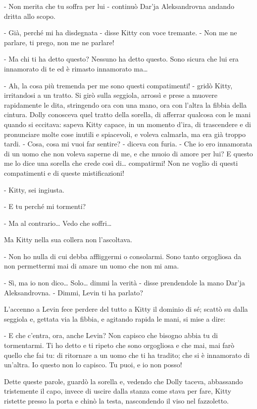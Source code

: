 - Non merita che tu soffra per lui - continuò Dar'ja Aleksandrovna andando dritta allo scopo. 

- Già, perché mi ha disdegnata - disse Kitty con voce tremante. - Non me ne parlare, ti prego, non me ne parlare! 

- Ma chi ti ha detto questo? Nessuno ha detto questo. Sono sicura che lui era innamorato di te ed è rimasto innamorato ma\ldots{} 

- Ah, la cosa più tremenda per me sono questi compatimenti! - gridò Kitty, irritandosi a un tratto. Si girò sulla seggiola, arrossì e prese a muovere rapidamente le dita, stringendo ora con una mano, ora con l'altra la fibbia della cintura. Dolly conosceva quel tratto della sorella, di afferrar qualcosa con le mani quando si eccitava: sapeva Kitty capace, in un momento d'ira, di trascendere e di pronunciare molte cose inutili e spiacevoli, e voleva calmarla, ma era già troppo tardi. - Cosa, cosa mi vuoi far sentire? - diceva con furia. - Che io ero innamorata di un uomo che non voleva saperne di me, e che muoio di amore per lui? E questo me lo dice una sorella che crede così di\ldots{} compatirmi! Non ne voglio di questi compatimenti e di queste mistificazioni! 

- Kitty, sei ingiusta. 

- E tu perché mi tormenti? 

- Ma al contrario\ldots{} Vedo che soffri\ldots{} 

Ma Kitty nella sua collera non l'ascoltava. 

- Non ho nulla di cui debba affliggermi o consolarmi. Sono tanto orgogliosa da non permettermi mai di amare un uomo che non mi ama. 

- Sì, ma io non dico\ldots{} Solo\ldots{} dimmi la verità - disse prendendole la mano Dar'ja Aleksandrovna. - Dimmi, Levin ti ha parlato? 

L'accenno a Levin fece perdere del tutto a Kitty il dominio di sé; scattò su dalla seggiola e, gettata via la fibbia, e agitando rapida le mani, si mise a dire: 

- E che c'entra, ora, anche Levin? Non capisco che bisogno abbia tu di tormentarmi. Ti ho detto e ti ripeto che sono orgogliosa e che mai, mai farò quello che fai tu: di ritornare a un uomo che ti ha tradito; che si è innamorato di un'altra. Io questo non lo capisco. Tu puoi, e io non posso! 

Dette queste parole, guardò la sorella e, vedendo che Dolly taceva, abbassando tristemente il capo, invece di uscire dalla stanza come stava per fare, Kitty ristette presso la porta e chinò la testa, nascondendo il viso nel fazzoletto. 

